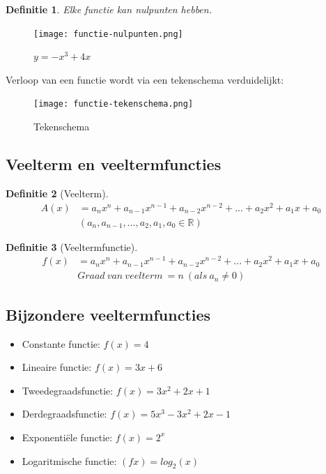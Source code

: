 \documentclass{article}
\newtheorem{theorem}{Definitie}[section]
\begin{document}
\begin{theorem}
    Elke functie kan nulpunten hebben.
\end{theorem}

\begin{figure}[H]
    \centering
    \texttt{[image: functie-nulpunten.png]}
    \caption{$y=-x^3 + 4x$}
\end{figure}

Verloop van een functie wordt via een tekenschema verduidelijkt:

\begin{figure}[H]
    \centering
    \texttt{[image: functie-tekenschema.png]}
    \caption{Tekenschema}
\end{figure}

\subsection{Veelterm en veeltermfuncties}

\begin{theorem}[Veelterm]
\begin{equation}
    \begin{aligned}
        A(x) &= a_nx^n + a_{n-1}x^{n-1} + a_{n-2}x^{n-2} + ... + a_{2}x^{2} + a_1x + a_0\\
        & (a_n,a_{n-1},...,a_2,a_1,a_0 \in \mathbb{R})
    \end{aligned}
\end{equation}

\end{theorem}

\begin{theorem}[Veeltermfunctie]
\begin{equation}
    \begin{aligned}
        f(x) &= a_nx^n + a_{n-1}x^{n-1} + a_{n-2}x^{n-2} + ... + a_{2}x^{2} + a_1x + a_0\\
        & Graad\ van\ veelterm\ = n\ (als\ a_n \neq 0)
    \end{aligned}
\end{equation}
\end{theorem}

\subsection{Bijzondere veeltermfuncties}

\begin{itemize}
    \item Constante functie: $f(x) = 4$
    \item Lineaire functie: $f(x) = 3x+6$
    \item Tweedegraadsfunctie: $f(x) = 3x^2 + 2x + 1$
    \item Derdegraadsfunctie: $f(x) = 5x^3 - 3x^2 + 2x - 1$
    \item Exponentiële functie: $f(x) = 2^x$
    \item Logaritmische functie: $(fx) = log_2(x)$
\end{itemize}
\end{document}
